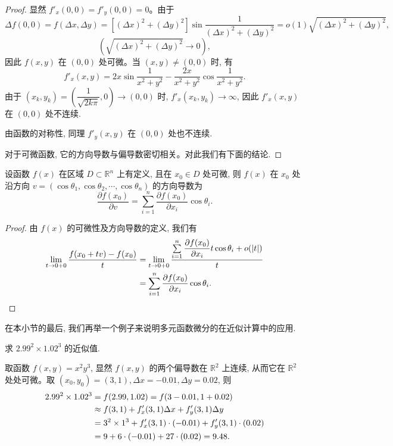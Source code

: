 \begin{proof}
显然 $f'_x(0,0)=f'_y(0,0)=0$。由于
\[
  \Delta f(0,0)=f(\Delta x,\Delta y)
  =[(\Delta x)^2+(\Delta y)^2]\sin\frac1{(\Delta x)^2+(\Delta y)^2}
  =o(1)\sqrt{(\Delta x)^2+(\Delta y)^2},
\]
\[
  \left(\sqrt{(\Delta x)^2+(\Delta y)^2}\to0\right),
\]
因此 $f(x,y)$ 在 $(0,0)$ 处可微。当 $(x,y)\ne(0,0)$ 时, 有
\[
  f'_x(x,y)=2x\sin\frac1{x^2+y^2}-\frac{2x}{x^2+y^2}\cos\frac1{x^2+y^2}.
\]
由于 $(x_k,y_k)=\left(\dfrac1{\sqrt{2k\pi}},0\right)\to(0,0)$ 时, $f'_x(x_k,y_k)\to\infty$, 因此 $f'_x(x,y)$ 在 $(0,0)$ 处不连续.

由函数的对称性, 同理 $f'_y(x,y)$ 在 $(0,0)$ 处也不连续.

对于可微函数, 它的方向导数与偏导数密切相关。对此我们有下面的结论.
\end{proof}


\begin{theorem}\label{theorem:ma-14-1-3}
设函数 $f(x)$ 在区域 $D\subset\mathbb R^n$ 上有定义, 且在 $x_0\in D$ 处可微, 则 $f(x)$ 在 $x_0$ 处沿方向 $v=(\cos\theta_1,\cos\theta_2,\cdots,\cos\theta_n)$ 的方向导数为
\[
  \frac{\partial f(x_0)}{\partial v}
  =\sum_{i=1}^n\frac{\partial f(x_0)}{\partial x_i}\cos\theta_i.
\]
\end{theorem}


\begin{proof}
由 $f(x)$ 的可微性及方向导数的定义, 我们有
\[
\begin{aligned}
  \lim_{t\to0+0}\frac{f(x_0+tv)-f(x_0)}{t}
  &=\lim_{t\to0+0}
  \frac{\sum\limits_{i=1}^n\dfrac{\partial f(x_0)}{\partial x_i}t\cos\theta_i+o(|t|)}{t}\\
  &=\sum_{i=1}^n\frac{\partial f(x_0)}{\partial x_i}\cos\theta_i.
\end{aligned}
\qedhere
\]
\end{proof}


在本小节的最后, 我们再举一个例子来说明多元函数微分的在近似计算中的应用.

\begin{example}\label{example:ma-14-1-6}
求 $2.99^2\times1.02^3$ 的近似值.
\end{example}


\begin{solve}
取函数 $f(x,y)=x^2y^3$, 显然 $f(x,y)$ 的两个偏导数在 $\mathbb R^2$ 上连续, 从而它在 $\mathbb R^2$ 处处可微。取 $(x_0,y_0)=(3,1), \Delta x=-0.01, \Delta y=0.02$, 则
\[
\begin{aligned}
  2.99^2\times1.02^3
  &=f(2.99,1.02)=f(3-0.01,1+0.02)\\
  &\approx f(3,1)+f'_x(3,1)\Delta x+f'_y(3,1)\Delta y\\
  &=3^2\times1^3+f'_x(3,1)\cdot(-0.01)+f'_y(3,1)\cdot(0.02)\\
  &=9+6\cdot(-0.01)+27\cdot(0.02)=9.48.
\end{aligned}
\qedhere
\]
\end{solve}



